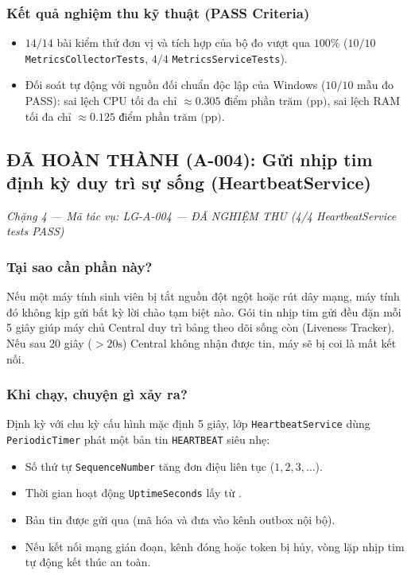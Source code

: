 \documentclass[12pt,a4paper]{article}
\begin{document}
\subsubsection{Kết quả nghiệm thu kỹ thuật (PASS Criteria)}
\begin{itemize}
  \item $14/14$ bài kiểm thử đơn vị và tích hợp của bộ đo vượt qua $100\%$ ($10/10$ \texttt{Metrics\allowbreak{}CollectorTests}, $4/4$ \texttt{MetricsServiceTests}).
  \item Đối soát tự động với nguồn đối chuẩn độc lập của Windows ($10/10$ mẫu đo PASS): sai lệch CPU tối đa chỉ $\approx 0.305\text{ điểm phần trăm (pp)}$, sai lệch RAM tối đa chỉ $\approx 0.125\text{ điểm phần trăm (pp)}$.
\end{itemize}

\subsection{ĐÃ HOÀN THÀNH (A-004): Gửi nhịp tim định kỳ duy trì sự sống (HeartbeatService)}
{\footnotesize\color{lgGray}\textit{Chặng 4 — Mã tác vụ: LG-A-004 — ĐÃ NGHIỆM THU (4/4 HeartbeatService tests PASS)}}\par
\vspace{2mm}

\subsubsection{Tại sao cần phần này?}
Nếu một máy tính sinh viên bị tắt nguồn đột ngột hoặc rút dây mạng, máy tính đó không kịp gửi bất kỳ lời chào tạm biệt nào. Gói tin nhịp tim gửi đều đặn mỗi 5 giây giúp máy chủ Central duy trì bảng theo dõi sống còn (Liveness Tracker). Nếu sau 20 giây ($> 20\text{s}$) Central không nhận được tin, máy sẽ bị coi là mất kết nối.

\subsubsection{Khi chạy, chuyện gì xảy ra?}
Định kỳ với chu kỳ cấu hình mặc định 5 giây, lớp \texttt{HeartbeatService} dùng \texttt{PeriodicTimer} phát một bản tin \texttt{HEARTBEAT} siêu nhẹ:
\begin{itemize}
  \item Số thứ tự \texttt{SequenceNumber} tăng đơn điệu liên tục ($1, 2, 3,\dots$).
  \item Thời gian hoạt động \texttt{UptimeSeconds} lấy từ .
  \item Bản tin được gửi qua  (mã hóa và đưa vào kênh outbox nội bộ).
  \item Nếu kết nối mạng gián đoạn, kênh đóng hoặc token bị hủy, vòng lặp nhịp tim tự động kết thúc an toàn.
\end{itemize}
\end{document}
